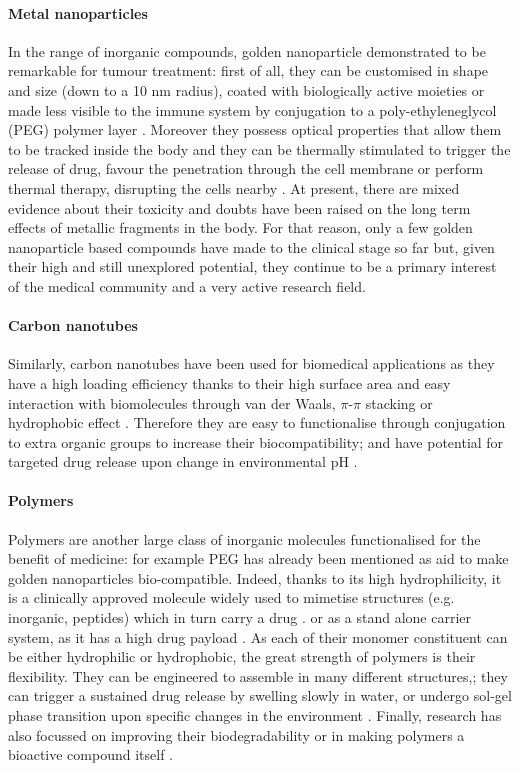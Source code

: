 \paragraph{Metal nanoparticles} In the range of inorganic compounds, golden nanoparticle demonstrated to be remarkable for tumour treatment: first of all, they can be customised in shape and size (down to a 10 nm radius), coated with biologically active moieties or made less visible to the immune system by conjugation to a poly-ethyleneglycol (PEG) polymer layer \cite{Singh2018}. Moreover they possess optical properties that allow them to be tracked inside the body and they can be thermally stimulated to trigger the release of drug, favour the penetration through the cell membrane or perform thermal therapy, disrupting the cells nearby \cite{Boisselier2009}. At present, there are mixed evidence about their toxicity \cite{Boisselier2009} and doubts have been raised on the long term effects of metallic fragments in the body. For that reason, only a few golden nanoparticle based compounds have made to the clinical stage so far \cite{Singh2018} but, given their high and still unexplored potential, they continue to be a primary interest of the medical community and a very active research field.

\paragraph{Carbon nanotubes}
Similarly, carbon nanotubes have been used for biomedical applications as they have a high loading efficiency thanks to their high surface area and easy interaction with biomolecules through van der Waals, $\pi$-$\pi$ stacking or hydrophobic effect \cite{Erol2017}. Therefore they are easy to functionalise through conjugation to extra organic groups to increase their biocompatibility; and have potential for targeted drug release upon change in environmental pH \cite{Depan2011}.

\paragraph{Polymers} Polymers are another large class of inorganic molecules functionalised for the benefit of medicine: for example PEG has already been mentioned as aid to make golden nanoparticles bio-compatible. Indeed, thanks to its high hydrophilicity, it is a clinically approved molecule widely used to mimetise structures (e.g. inorganic, peptides) which in turn carry a drug \cite{Lammers2009}. or as a stand alone carrier system, as it has a high drug payload \cite{Liechty2010}. As each of their monomer constituent can be either hydrophilic or hydrophobic, the great strength of polymers is their flexibility. They can be engineered to assemble in many different structures,\cite{Kawakatsu2004}; they can trigger a sustained drug release by swelling slowly in water,\cite{Nicolas2013} or undergo sol-gel phase transition upon specific changes in the environment \cite{Liechty2010}. Finally, research has also focussed on improving their biodegradability \cite{Nair2007} or in making polymers a bioactive compound itself \cite{Rao2018}.


